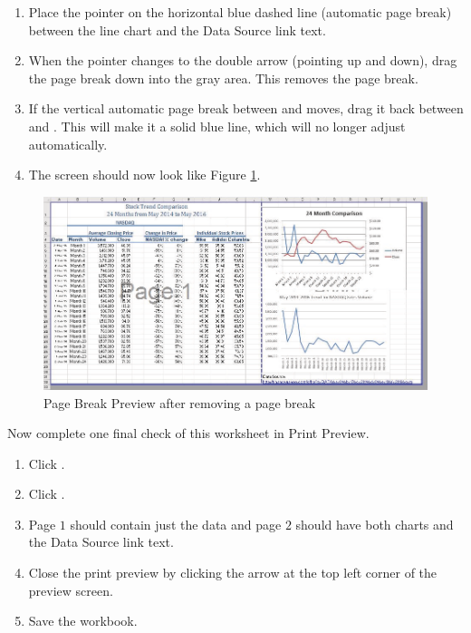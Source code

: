 \begin{enumbox}
	\begin{enumerate}
		\item Place the pointer on the horizontal blue dashed line (automatic page break) between the line chart and the Data Source link text.
		\item When the pointer changes to the double arrow (pointing up and down), drag the page break down into the gray area. This removes the page break.
		\item If the vertical automatic page break between  and  moves, drag it back between  and . This will make it a solid blue line, which will no longer adjust automatically.
		\item The screen should now look like Figure \ref{04:fig55}.
	\end{enumerate}
\end{enumbox}
	
\begin{figure}[H]
	\centering
	\includegraphics[width=\maxwidth{.95\linewidth}]{gfx/ch04_fig55}
	\caption{Page Break Preview after removing a page break}
	\label{04:fig55}
\end{figure}

Now complete one final check of this worksheet in Print Preview.

\begin{enumbox}
	\begin{enumerate}
		\item Click .
		\item Click .
		\item Page $ 1 $ should contain just the data and page $ 2 $ should have both charts and the Data Source link text.
		\item Close the print preview by clicking the arrow at the top left corner of the preview screen.
		\item Save the  workbook.
	\end{enumerate}
\end{enumbox}
	

